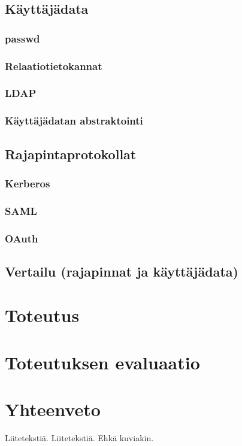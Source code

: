 \documentclass{tktltiki}
\begin{document}
\subsection{Käyttäjädata}

\subsubsection{passwd}

\subsubsection{Relaatiotietokannat}

\subsubsection{LDAP}

\subsubsection{Käyttäjädatan abstraktointi}

\subsection{Rajapintaprotokollat}

\subsubsection{Kerberos}

\subsubsection{SAML}

\subsubsection{OAuth}

\subsection{Vertailu (rajapinnat ja käyttäjädata)}

\section{Toteutus}
\section{Toteutuksen evaluaatio}
\section{Yhteenveto}


\lastpage
\appendices
{}
Liitetekstiä.
Liitetekstiä. Ehkä kuviakin.
\end{document}
